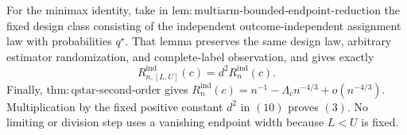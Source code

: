 For the minimax identity, take in \(\mathrm{lem:multiarm\text{-}bounded\text{-}endpoint\text{-}reduction}\) the fixed design class consisting of the independent outcome-independent assignment law with probabilities \(q^\star\). That lemma preserves the same design law, arbitrary estimator randomization, and complete-label observation, and gives exactly
\[
R_{n,[L,U]}^{\mathrm{ind}}(c)=d^2R_n^{\mathrm{ind}}(c).
\tag{10}
\]
Finally, \(\mathrm{thm:qstar\text{-}second\text{-}order}\) gives
\(R_n^{\mathrm{ind}}(c)=n^{-1}-\Lambda_cn^{-4/3}+o(n^{-4/3})\). Multiplication by the fixed positive constant \(d^2\) in \((10)\) proves \((3)\). No limiting or division step uses a vanishing endpoint width because \(L<U\) is fixed.
